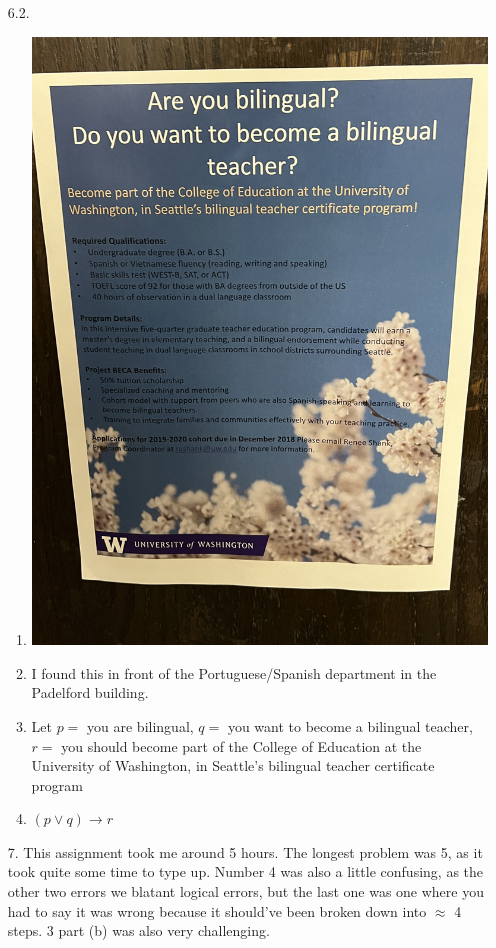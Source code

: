 \documentclass[12pt]{article}
\theoremstyle{definition}
\theoremstyle{remark}
\newcommand{\ra}{\rightarrow}
\begin{document}
\begin{enumerate}[leftmargin=\labelsep]
		\newpage
		\item[6.2.]
		\begin{enumerate}
			\item \includegraphics[scale=0.30,angle=-90]{sign.jpeg}
			\item I found this in front of the Portuguese/Spanish department in the Padelford building. 
			\item Let $p =$ you are bilingual, $q =$ you want to become a bilingual teacher, $r = $ you should become part of the College of Education at the University of Washington, in Seattle's bilingual teacher certificate program
			\item $(p \lor q) \ra r$
		\end{enumerate}
		
		\newpage
		\item[7.] This assignment took me around 5 hours. The longest problem was 5, as it took quite some time to type up. Number 4 was also a little confusing, as the other two errors we blatant logical errors, but the last one was one where you had to say it was wrong because it should've been broken down into $\approx$ 4 steps. 3 part (b) was also very challenging.
	\end{enumerate}
\end{document}

